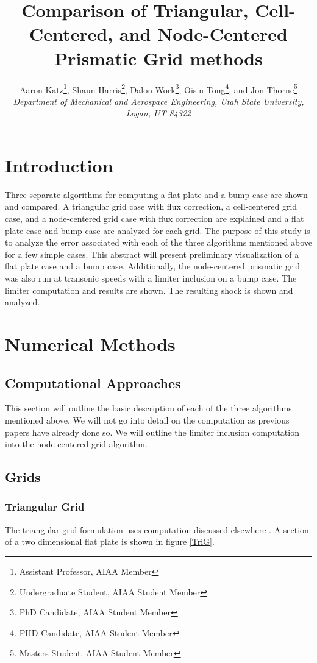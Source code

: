 \documentclass[final]{aiaa-pretty}
\author{ %
Aaron Katz\thanks{Assistant Professor, AIAA Member}, 
Shaun Harris\thanks{Undergraduate Student, AIAA Student Member},
Dalon Work\thanks{PhD Candidate, AIAA Student Member},
Oisin Tong\thanks{PHD Candidate, AIAA Student Member},
and Jon Thorne\thanks{Masters Student, AIAA Student Member} \\
\textit{Department of Mechanical and Aerospace Engineering, Utah State University, Logan, UT 84322}}
\title{Comparison of Triangular, Cell-Centered, and Node-Centered Prismatic Grid methods}
\begin{document}
\maketitle



\section{Introduction}
Three separate algorithms for computing a flat plate and a bump case are shown and compared.  A triangular grid case with flux correction, a cell-centered grid case, and a node-centered grid case with flux correction are explained and a flat plate case and bump case are analyzed for each grid. The purpose of this study is to analyze the error associated with each of the three algorithms mentioned above for a few simple cases.  This abstract will present preliminary visualization of a flat plate case and a bump case.  Additionally, the node-centered prismatic grid was also run at transonic speeds with a limiter inclusion on a bump case.  The limiter computation and results are shown.  The resulting shock is shown and analyzed. 

\section{Numerical Methods}
\subsection{Computational Approaches}
This section will outline the basic description of each of the three algorithms mentioned above.  We will not go into detail on the computation as previous papers have already done so.  We will outline the limiter inclusion computation into the node-centered grid algorithm.


\subsection{Grids}
 \subsubsection{Triangular Grid}
The triangular grid formulation uses computation discussed elsewhere \cite{Work2014}.  A section of a two dimensional flat plate is shown in figure \ref{TriG}.  
\end{document}
